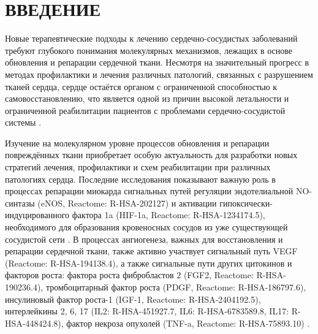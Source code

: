 \section{ВВЕДЕНИЕ}

Новые терапевтические подходы к лечению сердечно-сосудистых заболеваний требуют глубокого понимания молекулярных механизмов, лежащих в основе обновления и репарации сердечной ткани. Несмотря на значительный прогресс в методах профилактики и лечения различных патологий, связанных с разрушением тканей сердца, сердце остаётся органом с ограниченной способностью к самовосстановлению, что является одной из причин высокой летальности и ограниченной реабилитации пациентов с проблемами сердечно-сосудистой системы \cite{martin2023new}.

Изучение на молекулярном уровне процессов обновления и репарации повреждённых ткани приобретает особую актуальность для разработки новых стратегий лечения, профилактики и схем реабилитации при различных патологиях сердца. Последние исследования показывают важную роль в процессах репарации миокарда сигнальных путей регуляции эндотелиальной NO-синтазы (eNOS, Reactome: R-HSA-202127) \cite{zou2019vegf, dominguez2018urocortin, tran2022endothelial} и активации гипоксически-индуцированного фактора 1a (HIF-1a, Reactome: R-HSA-1234174.5), необходимого для образования кровеносных сосудов из уже существующей сосудистой сети \cite{gonzalez2017hypoxia}. В процессах ангиогенеза, важных для восстановления и репарации сердечной ткани, также активно участвует сигнальный путь VEGF (Reactome: R-HSA-194138.4)\cite{kobayashi2017dynamics, ferraro2019pro}, а также сигнальные пути других цитокинов и факторов роста: фактора роста фибробластов 2 (FGF2, Reactome: R-HSA-190236.4), тромбоцитарный фактор роста (PDGF, Reactome: R-HSA-186797.6), инсулиновый фактор роста-1 (IGF-1, Reactome: R-HSA-2404192.5), интерлейкины 2, 6, 17 (IL2: R-HSA-451927.7, IL6: R-HSA-6783589.8, IL17: R-HSA-448424.8), фактор некроза опухолей (TNF-a, Reactome: R-HSA-75893.10) \cite{virag2007fgf2, ono1997hgf,tomita2003hgf, zhao2011pdgf, dobrucki2011igf1,iwakura2006estradiol, barnabas2013estrogen,bouchentouf2011il2, mayfield2017il6, kishore2011tnf,xia2007mcp1}.

